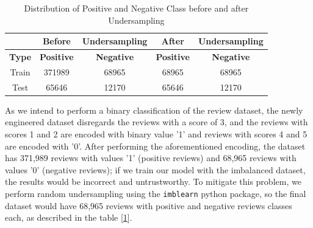 \documentclass[11pt]{article}
\begin{document}
  \begin{table}[h!]
 \scriptsize
     \centering
     \begin{tabular}{c| c c | c c}
     & Before &Undersampling& After& Undersampling \\
     \hline 
        \textbf{Type} & \textbf{Positive} & \textbf{Negative} &\textbf{Positive} &\textbf{Negative}\\ \hline 
         Train &  371989 &68965 &68965 & 68965\\
          Test & 65646 &12170 & 65646 &12170\\ \hline 
     \end{tabular}
     \caption{Distribution of Positive and Negative Class before and after Undersampling}
     \label{tab:class_distri}
 \end{table}
 As we intend to perform a binary classification of the review dataset, the newly engineered dataset disregards the reviews with a score of 3, and the reviews with scores 1 and 2 are encoded with binary value '1' and reviews with scores 4 and 5 are encoded with '0'. After performing the aforementioned encoding, the dataset has 371,989 reviews with values '1' (positive reviews) and 68,965 reviews with values '0' (negative reviews); if we train our model with the imbalanced dataset, the results would be incorrect and untrustworthy. To mitigate this problem, we perform random undersampling using the \texttt{imblearn} python package, so the final dataset would have 68,965 reviews with positive and negative reviews classes each, as described in the table [\ref{tab:class_distri}].

 
\end{document}
